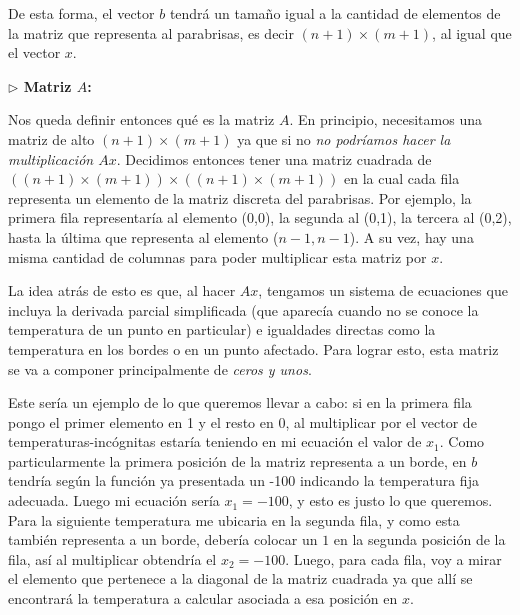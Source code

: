 De esta forma, el vector $b$ tendrá un tamaño igual a la cantidad de elementos de la matriz que representa al parabrisas, es decir $(n+1) \times (m+1)$, al igual que el vector $x$.

\vspace{\baselineskip}

{\large \textbf{ $\rhd$ Matriz $A$:}}

\vspace{\baselineskip}

Nos queda definir entonces qué es la matriz $A$. En principio, necesitamos una matriz de alto $(n+1) \times (m+1)$ ya que si no \textit{no podríamos hacer la multiplicación $Ax$}. Decidimos entonces tener una matriz cuadrada de  $((n+1) \times (m+1)) \times  ((n+1) \times (m+1))$ en la cual cada fila representa un elemento de la matriz discreta del parabrisas. Por ejemplo, la primera fila representaría al elemento (0,0), la segunda al (0,1), la tercera al (0,2), hasta la última que representa al elemento ($n-1,n-1$). A su vez, hay una misma cantidad de columnas para poder multiplicar esta matriz por $x$.

La idea atrás de esto es que, al hacer $Ax$, tengamos un sistema de ecuaciones que incluya la derivada parcial simplificada (que aparecía cuando no se conoce la temperatura de un punto en particular) e igualdades directas como la temperatura en los bordes o en un punto afectado. Para lograr esto, esta matriz se va a componer principalmente de \textit{ceros y unos}.

\vspace{\baselineskip}

Este sería un ejemplo de lo que queremos llevar a cabo: si en la primera fila pongo el primer elemento en 1 y el resto en 0, al multiplicar por el vector de temperaturas-incógnitas estaría teniendo en mi ecuación el valor de $x_1$. Como particularmente la primera posición de la matriz representa a un borde, en $b$ tendría según la función ya presentada un -100 indicando la temperatura fija adecuada. Luego mi ecuación sería $x_1 = -100$, y esto es justo lo que queremos. Para la siguiente temperatura me ubicaria en la segunda fila, y como esta también representa a un borde, debería colocar un $1$ en la segunda posición de la fila, así al multiplicar obtendría el $x_2 = -100$. Luego, para cada fila, voy a mirar el elemento que pertenece a la diagonal de la matriz cuadrada ya que allí se encontrará la temperatura a calcular asociada a esa posición en $x$.

